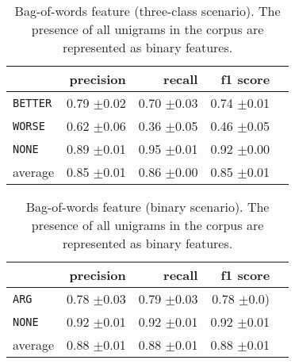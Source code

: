 	
	\begin{table}[htbp] 
		\centering 
		\caption{Bag-of-words feature (three-class scenario). The presence of all unigrams in the corpus are represented as binary features.} 
		\label{  }
		\begin{tabular}{@{}lrrrr@{}}
			\toprule
			        & precision                & recall                   & f1 score                 \\ \midrule 
			\texttt{BETTER}	&	 0.79 \scriptsize{$\pm$0.02} &	 0.70 \scriptsize{$\pm$0.03} &	 0.74 \scriptsize{$\pm$0.01}  \\ 
\texttt{WORSE}	&	 0.62 \scriptsize{$\pm$0.06} &	 0.36 \scriptsize{$\pm$0.05} &	 0.46 \scriptsize{$\pm$0.05}  \\ 
\texttt{NONE}	&	 0.89 \scriptsize{$\pm$0.01} &	 0.95 \scriptsize{$\pm$0.01} &	 0.92 \scriptsize{$\pm$0.00}  \\ 
average	&	 0.85 \scriptsize{$\pm$0.01} &	 0.86 \scriptsize{$\pm$0.00} &	 0.85 \scriptsize{$\pm$0.01}  \\ 			\bottomrule
		\end{tabular}
	\end{table}
	
	
	\begin{table}[htbp] 
		\centering 
		\caption{Bag-of-words feature (binary scenario). The presence of all unigrams in the corpus are represented as binary features.} 

		\begin{tabular}{@{}lrrrr@{}}
			\toprule
			        & precision                & recall                   & f1 score                 \\ \midrule 
	\texttt{ARG}	&	 0.78 \scriptsize{$\pm$0.03} &	 0.79 \scriptsize{$\pm$0.03} &	 0.78 \scriptsize{$\pm$0.0)}  \\ 
	\texttt{NONE}	&	 0.92 \scriptsize{$\pm$0.01} &	 0.92 \scriptsize{$\pm$0.01} &	 0.92 \scriptsize{$\pm$0.01}  \\ 
average	&	 0.88 \scriptsize{$\pm$0.01} &	 0.88 \scriptsize{$\pm$0.01} &	 0.88 \scriptsize{$\pm$0.01}  \\ 
			\bottomrule
		\end{tabular}
	\end{table}
	
